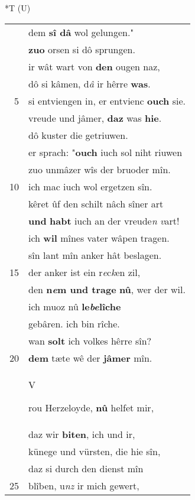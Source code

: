 \documentclass[8pt,a4paper,notitlepage]{article}
\begin{document}
\begin{table}[ht]
\begin{minipage}[t]{0.5\linewidth}
\end{minipage}
\hspace{0.5cm}
\begin{minipage}[t]{0.5\linewidth}
\small
\begin{center}*T (U)
\end{center}
\begin{tabular}{rl}
 & dem \textbf{sî dâ} wol gelungen."\\ 
 & \textbf{zuo} orsen si dô sprungen.\\ 
 & ir wât wart von \textbf{den} ougen naz,\\ 
 & dô si kâmen, d\textit{â} ir hêrre \textbf{was}.\\ 
5 & si entviengen in, er entvienc \textbf{ouch} sie.\\ 
 & vreude und jâmer, \textbf{daz} was \textbf{hie}.\\ 
 & dô kuster die getriuwen.\\ 
 & er sprach: "\textbf{ouch} iuch sol niht riuwen\\ 
 & zuo unmâzer wîs der bruoder mîn.\\ 
10 & ich mac iuch wol ergetzen sîn.\\ 
 & kêret ûf den schilt nâch sîner art\\ 
 & \textbf{und} \textbf{habt} iuch an der vreude\textit{n} \textit{v}art!\\ 
 & ich \textbf{wil} mînes vater wâpen tragen.\\ 
 & sîn lant mîn anker hât beslagen.\\ 
15 & der anker ist ein r\textit{e}c\textit{k}en zil,\\ 
 & den \textbf{n\textit{e}m und trage} \textbf{nû}, wer der wil.\\ 
 & ich muoz nû \textbf{le\textit{be}lîche}\\ 
 & gebâren. ich bin rîche.\\ 
 & wan \textbf{solt} ich volkes hêrre sîn?\\ 
20 & \textbf{dem} tæte wê der \textbf{jâmer} mîn.\\ 
 & \begin{large}V\end{large}rou Herzeloyde, \textbf{nû} helfet mir,\\ 
 & daz wir \textbf{biten}, ich und ir,\\ 
 & künege und vürsten, die hie sîn,\\ 
 & daz si durch den dienst mîn\\ 
25 & blîben, u\textit{nz} ir mich gewert,\\ 

\end{tabular}
\end{minipage}
\end{table}
\end{document}
